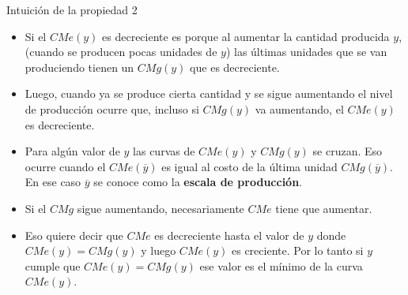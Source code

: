 \documentclass{beamer}
\theoremstyle{definition}
\begin{document}
\begin{frame}{Intuición de la propiedad 2}\small
\begin{itemize}
       
    
   \item Si el $CMe(y)$ es decreciente es porque al aumentar la cantidad producida $y$, (cuando se producen pocas unidades de $y$) las últimas unidades que se van produciendo tienen un $CMg(y)$ que es decreciente.
   
  \item Luego, cuando ya se produce cierta cantidad y se sigue aumentando el nivel de producción ocurre que, incluso si $CMg(y)$ va aumentando, el $CMe(y)$ es decreciente.
   
   \vspace{8pt}
   
   \item Para algún valor de $y$ las curvas de $CMe(y)$ y $CMg(y)$ se cruzan. Eso ocurre cuando el $CMe(\overline{y})$ es igual al costo de la última unidad $CMg(\overline{y})$. En ese caso $\overline{y}$ se conoce como la \textbf{escala de producción}. 
   
   \item Si el $CMg$ sigue aumentando, necesariamente $CMe$ tiene que aumentar.
   
   \vspace{8pt}
   
  \item Eso quiere decir que $CMe$ es decreciente hasta el valor de $y$ donde $CMe(y)=CMg(y)$ y luego $CMe(y)$ es creciente. Por lo tanto si $y$ cumple que $CMe(y)=CMg(y)$ ese valor es el mínimo de la curva $CMe(y)$.
   \end{itemize}
\end{frame}

\end{document}

